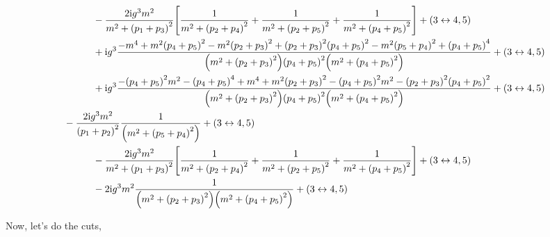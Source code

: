 \begin{align*}
    &\quad\quad\quad-\frac{2\textnormal{i} g^3m^2}{m^2+\qty(p_1+p_3)^2}\qty[\frac{1}{m^2+\qty(p_2+p_4)^2}+\frac{1}{m^2+\qty(p_2+p_5)^2}+\frac{1}{m^2+\qty(p_4+p_5)^2}]+\qty(3\leftrightarrow4,5)\\
    &\quad\quad\quad+\textnormal{i} g^3\frac{-m^4 +m^2\qty(p_4+p_5)^2 -m^2\qty(p_2+p_3)^2 +\qty(p_2+p_3)^2\qty(p_4+p_5)^2-m^2\qty(p_5+p_4)^2+\qty(p_4+p_5)^4}{\qty(m^2+\qty(p_2+p_3)^2)\qty(p_4+p_5)^2\qty(m^2+\qty(p_4+p_5)^2)}+\qty(3\leftrightarrow4,5)\\
    &\quad\quad\quad+\textnormal{i} g^3\frac{-\qty(p_4+p_5)^2m^2-\qty(p_4+p_5)^4+m^4+m^2\qty(p_2+p_3)^2-\qty(p_4+p_5)^2m^2-\qty(p_2+p_3)^2\qty(p_4+p_5)^2}{\qty(m^2+\qty(p_2+p_3)^2)\qty(p_4+p_5)^2\qty(m^2+\qty(p_4+p_5)^2)}+\qty(3\leftrightarrow4,5)\\
    &-\frac{2\textnormal{i} g^3m^2}{\qty(p_1+p_2)^2}\frac{1}{\qty(m^2+\qty(p_5+p_4)^2)}+\qty(3\leftrightarrow4,5)\\
    &\quad\quad\quad-\frac{2\textnormal{i} g^3m^2}{m^2+\qty(p_1+p_3)^2}\qty[\frac{1}{m^2+\qty(p_2+p_4)^2}+\frac{1}{m^2+\qty(p_2+p_5)^2}+\frac{1}{m^2+\qty(p_4+p_5)^2}]+\qty(3\leftrightarrow4,5)\\
    &\quad\quad\quad-2\textnormal{i} g^3m^2\frac{1}{\qty(m^2+\qty(p_2+p_3)^2)\qty(m^2+\qty(p_4+p_5)^2)}+\qty(3\leftrightarrow4,5)
\end{align*}

Now, let's do the cuts,

\begin{align*}
    
\end{align*}